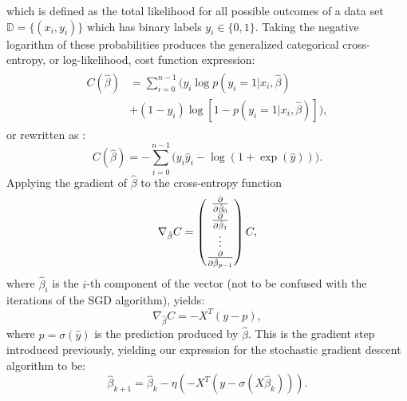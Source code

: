             which is defined as the total likelihood for all possible outcomes of a data set $\mathds{D}=\{ (x_i, y_i) \}$ which has binary labels $y_i \in \{ 0,1 \}$. Taking the negative logarithm of these probabilities produces the generalized categorical cross-entropy, or log-likelihood, cost function expression:
            \begin{align}
                \begin{split}
                    C(\hat{\beta}) &= \sum_{i=0}^{n-1} \bigg( y_i\log p(y_i=1|x_i, \hat{\beta}) \\&+ (1-y_i)\log\left[1-p(y_i=1|x_i, \hat{\beta})\right] \bigg),
                \end{split}
            \end{align}
            or rewritten as \cite{lecturenotes}:
            \begin{equation}
                C(\hat{\beta}) = -\sum^{n-1}_{i=0} \big( y_i \hat{y}_i - \log\left( 1 + \exp(\hat{y}) \right) \big).
            \end{equation}
            Applying the gradient of $\hat{\beta}$ to the cross-entropy function
            \begin{equation}
                \nabla_{\hat{\beta}}C =
                \begin{pmatrix}
                    \pdv{}{\hat{\beta}_0} \\
                    \pdv{}{\hat{\beta}_1} \\ 
                    \vdots \\ 
                    \pdv{}{\hat{\beta}_{p-1}} \\ 
                \end{pmatrix}C,
            \end{equation}
            where $\hat{\beta}_i$ is the $i$-th component of the vector (not to be confused with the iterations of the SGD algorithm), yields:
            \begin{equation}
                \nabla_{\hat{\beta}} C = -X^T\left( y - p \right),
            \end{equation}
            where $p=\sigma(\hat{y})$ is the prediction produced by $\hat{\beta}$. This is the gradient step introduced previously, yielding our expression for the stochastic gradient descent algorithm to be:
            \begin{equation}
                \hat{\beta}_{k+1} = \hat{\beta}_k - \eta \left( -X^T\left( y-\sigma(X\hat{\beta}_k) \right) \right).
            \end{equation}
